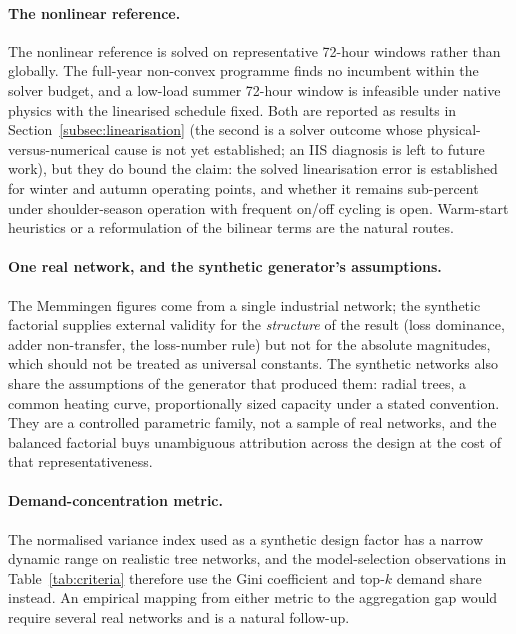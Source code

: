 \paragraph{The nonlinear reference.}
The nonlinear reference is solved on representative 72-hour windows rather than globally. The
full-year non-convex programme finds no incumbent within the solver budget, and a low-load
summer 72-hour window is infeasible under native physics with the linearised schedule fixed. Both
are reported as results in Section~\ref{subsec:linearisation} (the second is a solver outcome
whose physical-versus-numerical cause is not yet established; an IIS diagnosis is left to future
work), but they do bound the claim: the solved linearisation error is established for winter
and autumn operating points, and whether it remains sub-percent under shoulder-season
operation with frequent on/off cycling is open. Warm-start heuristics or a reformulation
of the bilinear terms are the natural routes.

\paragraph{One real network, and the synthetic generator's assumptions.}
The Memmingen figures come from a single industrial network; the synthetic factorial
supplies external validity for the \emph{structure} of the result (loss dominance,
adder non-transfer, the loss-number rule) but not for the absolute magnitudes, which
should not be treated as universal constants. The synthetic networks also share the
assumptions of the generator that produced them: radial trees, a common heating curve,
proportionally sized capacity under a stated convention. They are a controlled parametric
family, not a sample of real networks, and the balanced factorial buys unambiguous
attribution across the design at the cost of that representativeness.

\paragraph{Demand-concentration metric.}
The normalised variance index used as a synthetic design factor has a narrow dynamic range
on realistic tree networks, and the model-selection observations in
Table~\ref{tab:criteria} therefore use the Gini coefficient and top-$k$ demand share
instead. An empirical mapping from either metric to the aggregation gap would require
several real networks and is a natural follow-up.
